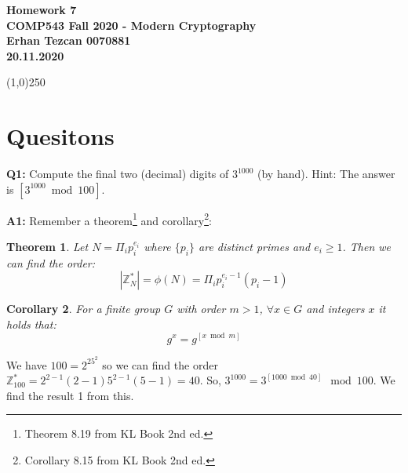 \documentclass[12pt,reqno]{amsart}
\newcommand{\code}[1]{\texttt{#1}}
\newtheorem{theorem}{Theorem}[section]
\newtheorem{corollary}[theorem]{Corollary}
\begin{document}
\begin{center}
\large\textbf{Homework 7 \\ COMP543 Fall 2020 - Modern Cryptography \\}
\normalsize\textbf{ Erhan Tezcan 0070881 \\ 20.11.2020} \\
\end{center}

\begin{center}
\line(1,0){250}
\end{center}

%
%

%
%
\section{Quesitons}
\textbf{Q1:} Compute the final two (decimal) digits of $3^{1000}$ (by hand). Hint: The answer is $[3^{1000} \bmod 100]$.

\textbf{A1:} Remember a theorem\footnote{Theorem 8.19 from KL Book 2nd ed.} and corollary\footnote{Corollary 8.15 from KL Book 2nd ed.}:
\begin{theorem}
Let $N=\Pi_ip_i^{e_i}$ where $\{p_i\}$ are distinct primes and $e_i \geq 1$. Then we can find the order:
$$
|\mathbb{Z}_N^*|=\phi(N)=\Pi_ip_i^{e_i-1}(p_i-1)
$$
\end{theorem}
\begin{corollary}
For a finite group $G$ with order $m>1$, $\forall x \in G$ and integers $x$ it holds that:
$$
g^x = g^{[x \bmod m]}
$$
\end{corollary}
We have $100 = 2^25^2$ so we can find the order $\mathbb{Z}_100^*= 2^{2-1}(2-1)5^{2-1}(5-1) = 40$. So, $3^{1000} = 3^{[1000 \bmod 40]} \mod 100$. We find the result 1 from this.
\end{document}
